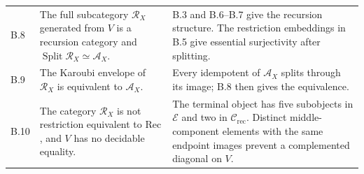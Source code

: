 \documentclass[11pt]{article}
\theoremstyle{definition}\newtheorem{definition}[theorem]{Definition}
\newcommand{\Split}{\operatorname{Split}}
\newcommand{\R}{\mathscr R}
\newcommand{\A}{\mathcal A}
\newcommand{\E}{\mathcal E}
\begin{document}
\begin{longtable}{@{}p{}p{}p{}@{}}
B.8 & The full subcategory $\R_X$ generated from $V$ is a recursion category and $\Split\R_X\simeq\A_X$. & B.3 and B.6--B.7 give the recursion structure. The restriction embeddings in B.5 give essential surjectivity after splitting.\\
B.9 & The Karoubi envelope of $\R_X$ is equivalent to $\A_X$. & Every idempotent of $\A_X$ splits through its image; B.8 then gives the equivalence.\\
B.10 & The category $\R_X$ is not restriction equivalent to $\mathrm{Rec}$, and $V$ has no decidable equality. & The terminal object has five subobjects in $\E$ and two in $\mathcal C_{\mathrm{rec}}$. Distinct middle-component elements with the same endpoint images prevent a complemented diagonal on $V$.\\
\bottomrule
\end{longtable}
\end{document}
